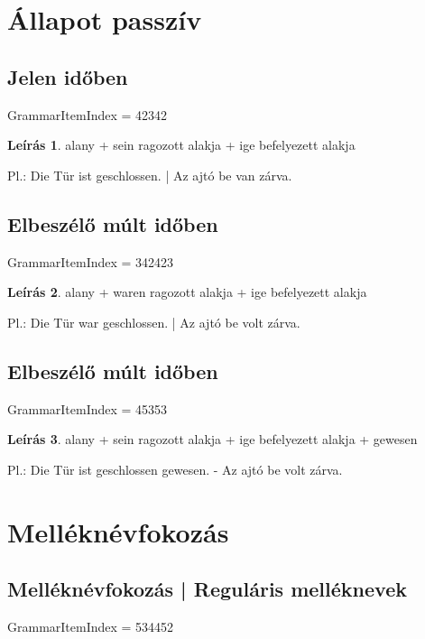 \documentclass{article}
\theoremstyle{definition}
\newtheorem*{desc}{Leírás}
\begin{document}
\section{Állapot passzív}

\subsection{Jelen időben}

GrammarItemIndex = 42342

\begin{desc}
alany + sein ragozott alakja + ige befelyezett alakja

Pl.: Die Tür ist geschlossen. | Az ajtó be van zárva.
\end{desc}

\subsection{Elbeszélő múlt időben}

GrammarItemIndex = 342423

\begin{desc}
alany + waren ragozott alakja + ige befelyezett alakja

Pl.: Die Tür war geschlossen. | Az ajtó be volt zárva.
\end{desc}

\subsection{Elbeszélő múlt időben}

GrammarItemIndex = 45353

\begin{desc}
alany + sein ragozott alakja + ige befelyezett alakja + gewesen

Pl.: Die Tür ist geschlossen gewesen. - Az ajtó be volt zárva.
\end{desc}

\section{Melléknévfokozás}

\subsection{Melléknévfokozás | Reguláris melléknevek}

GrammarItemIndex = 534452
\end{document}
